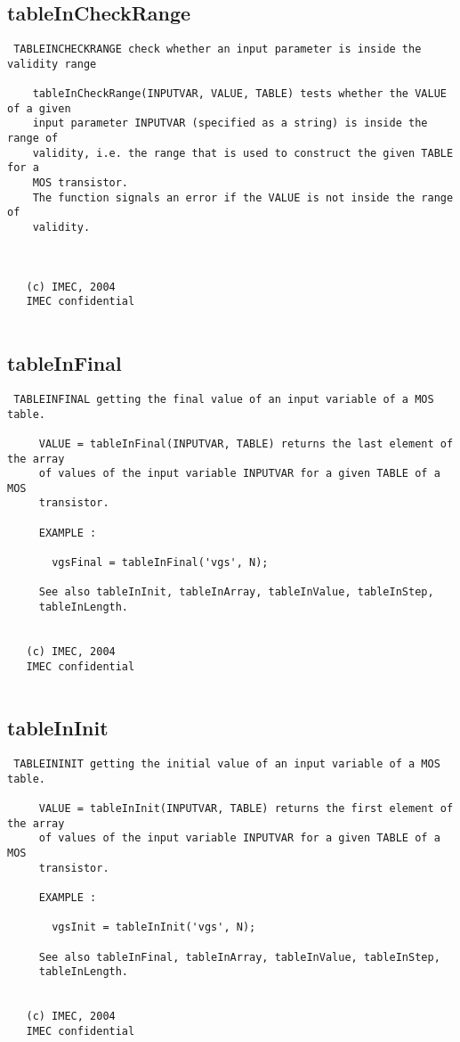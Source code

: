 \newpage
\subsection{tableInCheckRange}
\label{sec:tableInCheckRange}
\begin{verbatim}
 TABLEINCHECKRANGE check whether an input parameter is inside the validity range
 
    tableInCheckRange(INPUTVAR, VALUE, TABLE) tests whether the VALUE of a given
    input parameter INPUTVAR (specified as a string) is inside the range of
    validity, i.e. the range that is used to construct the given TABLE for a
    MOS transistor.
    The function signals an error if the VALUE is not inside the range of
    validity.
 
 
 
   (c) IMEC, 2004
   IMEC confidential 
 

\end{verbatim}

\newpage
\subsection{tableInFinal}
\label{sec:tableInFinal}
\begin{verbatim}
 TABLEINFINAL getting the final value of an input variable of a MOS table.
 
     VALUE = tableInFinal(INPUTVAR, TABLE) returns the last element of the array
     of values of the input variable INPUTVAR for a given TABLE of a MOS
     transistor.
 
     EXAMPLE :
 
       vgsFinal = tableInFinal('vgs', N);
 
     See also tableInInit, tableInArray, tableInValue, tableInStep,
     tableInLength.
 
 
   (c) IMEC, 2004
   IMEC confidential 
 

\end{verbatim}

\newpage
\subsection{tableInInit}
\label{sec:tableInInit}
\begin{verbatim}
 TABLEININIT getting the initial value of an input variable of a MOS table.
 
     VALUE = tableInInit(INPUTVAR, TABLE) returns the first element of the array
     of values of the input variable INPUTVAR for a given TABLE of a MOS
     transistor.
 
     EXAMPLE :
 
       vgsInit = tableInInit('vgs', N);
 
     See also tableInFinal, tableInArray, tableInValue, tableInStep,
     tableInLength.
 
 
   (c) IMEC, 2004
   IMEC confidential 
 

\end{verbatim}

